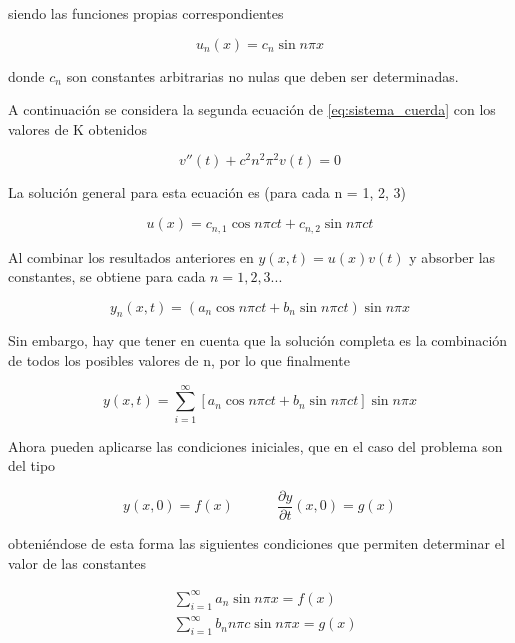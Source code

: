 \documentclass[11pt]{article}
\begin{document}
siendo las funciones propias correspondientes

\begin{equation}
	u_n(x) = c_n\sin{n\pi{x}}
\end{equation}

donde $c_n$ son constantes arbitrarias no nulas que deben ser determinadas.

A continuación se considera la segunda ecuación de \eqref{eq:sistema_cuerda} con los
valores de K obtenidos

\begin{equation}
	v''(t) + c^2n^2\pi^2v(t) = 0
\end{equation}
 
La solución general para esta ecuación es (para cada n = 1, 2, 3)

\begin{equation}
	u(x) = c_{n,1}\cos{n\pi{c}t} + c_{n,2}\sin{n\pi{c}t}
\end{equation}

Al combinar los resultados anteriores en $y(x,t) = u(x)v(t)$ y absorber las constantes, se
obtiene para cada $n = 1, 2, 3 ...$

\begin{equation}
	y_n(x,t) = (a_n\cos{n\pi{c}t} + b_n\sin{n\pi{c}t})\sin{n\pi{x}}
\end{equation}

Sin embargo, hay que tener en cuenta que la solución completa es la combinación de todos
los posibles valores de n, por lo que finalmente

\begin{equation}
	y(x,t) = \sum\limits_{i=1}^\infty[a_n\cos{n\pi{c}t} + b_n\sin{n\pi{c}t}]\sin{n\pi{x}}
\label{eq:sol_analitica}
\end{equation}

Ahora pueden aplicarse las condiciones iniciales, que en el caso del problema son del tipo

\begin{equation}
	y(x, 0) = f(x)~~~~~~~~~~~~~~\frac{\partial{y}}{\partial{t}}(x, 0) = g(x)
\end{equation}

obteniéndose de esta forma las siguientes condiciones que permiten determinar el valor de
las constantes

\begin{subequations}
\begin{flalign}
	&\sum\limits_{i=1}^\infty a_n \sin{n\pi{x}} = f(x)\\
	&\sum\limits_{i=1}^\infty b_n n\pi{c} \sin{n\pi{x}} = g(x)
\end{flalign}
\end{subequations}
\end{document}
